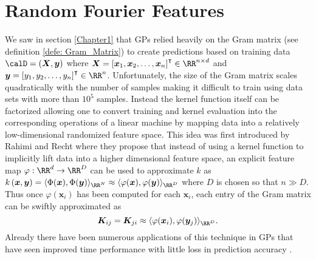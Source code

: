 \section{Random Fourier Features}\label{Chapter3}
We saw in section \ref{Chapter1} that GPs relied heavily on the Gram matrix (see definition \ref{defe: Gram_Matrix}) to create predictions based on training data $\calD = \left( \bm{X} , \bm{y} \right)$ where $\bm{X} = \left[ \bm{x}_1 , \bm{x}_2 , \ldots , \bm{x}_n \right]^{\intercal} \in \RR^{n \times d}$ and $\bm{y} = \left[ y_1 , y_2 , \ldots , y_n \right]^{\intercal} \in \RR^{n}$. Unfortunately, the size of the Gram matrix scales quadratically with the number of samples making it difficult to train using data sets with more than $10^5$ samples. Instead the kernel function itself can be factorized allowing one to convert training and kernel evaluation into the corresponding operations of a linear machine by mapping data into a relatively low-dimensional randomized feature space. This idea was first introduced by Rahimi and Recht \cite{NIPS2007_013a006f} where they propose that instead of using a kernel function to implicitly lift data into a higher dimensional feature space, an explicit feature map $\varphi : \RR^d \to \RR^D$ can be used to approximate $k$ as $k \left( \bm{x} , \bm{y} \right) = \langle \Phi (\bm{x}) , \Phi (\bm{y}) \rangle_{\RR^N} \approx \langle \varphi (\bm{x}) , \varphi (\bm{y}) \rangle_{\RR^D}$ where $D$ is chosen so that $n \gg  D$. Thus once $\varphi (\bm{x}_i)$ has been computed for each $\bm{x}_i$, each entry of the Gram matrix can be swiftly approximated as
\[
    \bm{K}_{ij} = \bm{K}_{ji} \approx \langle \varphi (\bm{x}_i) , \varphi (\bm{y}_j) \rangle_{\RR^D}.
\]
Already there have been numerous applications of this technique in GPs that have seen improved time performance with little loss in prediction accuracy \cite{PotapczynskiAndres2021BSGP}.





